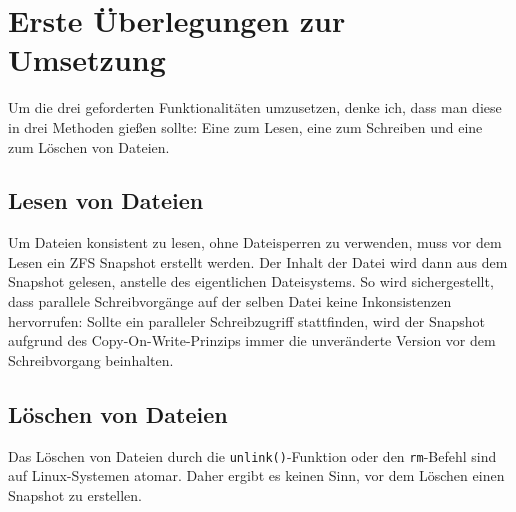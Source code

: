 \documentclass[12pt]{article}
\date{}
\begin{document}
	
\section*{Erste Überlegungen zur Umsetzung}
Um die drei geforderten Funktionalitäten umzusetzen, denke ich, dass man diese in drei Methoden gießen sollte:
Eine zum Lesen, eine zum Schreiben und eine zum Löschen von Dateien.

\subsection*{Lesen von Dateien}
Um Dateien konsistent zu lesen, ohne Dateisperren zu verwenden, muss vor dem Lesen ein ZFS Snapshot erstellt werden.
Der Inhalt der Datei wird dann aus dem Snapshot gelesen, anstelle des eigentlichen Dateisystems.
So wird sichergestellt, dass parallele Schreibvorgänge auf der selben Datei keine Inkonsistenzen hervorrufen:
Sollte ein paralleler Schreibzugriff stattfinden, wird der Snapshot aufgrund des Copy-On-Write-Prinzips immer die unveränderte Version vor dem Schreibvorgang beinhalten.

\subsection*{Löschen von Dateien}
Das Löschen von Dateien durch die \texttt{unlink()}-Funktion oder den \texttt{rm}-Befehl sind auf Linux-Systemen atomar.
Daher ergibt es keinen Sinn, vor dem Löschen einen Snapshot zu erstellen.
\end{document}
